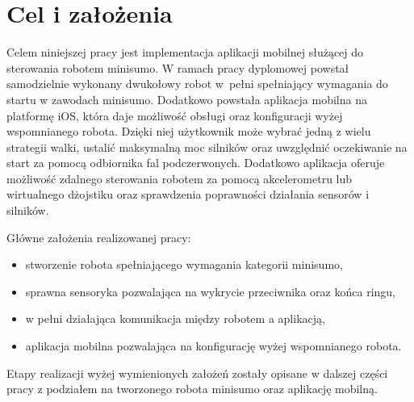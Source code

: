 \section{Cel i założenia}
Celem niniejszej pracy jest implementacja aplikacji mobilnej służącej do sterowania robotem minisumo. W ramach pracy dyplomowej powstał samodzielnie wykonany dwukołowy robot w~pełni spełniający wymagania do startu w zawodach minisumo. Dodatkowo powstała aplikacja mobilna na platformę iOS, która daje możliwość obsługi oraz konfiguracji wyżej wspomnianego robota. Dzięki niej użytkownik może wybrać jedną z wielu strategii walki, ustalić maksymalną moc silników oraz uwzględnić oczekiwanie na start za pomocą odbiornika fal podczerwonych. Dodatkowo aplikacja oferuje możliwość zdalnego sterowania robotem za pomocą akcelerometru lub wirtualnego dżojstiku oraz sprawdzenia poprawności działania sensorów i silników. 

Główne założenia realizowanej pracy:
\begin{itemize}
\item stworzenie robota spełniającego wymagania kategorii minisumo,
\item sprawna sensoryka pozwalająca na wykrycie przeciwnika oraz końca ringu,
\item w pełni działająca komunikacja między robotem a aplikacją,
\item aplikacja mobilna pozwalająca na konfigurację wyżej wspomnianego robota.
\end{itemize}

Etapy realizacji wyżej wymienionych założeń zostały opisane w dalszej części pracy z podziałem na tworzonego robota minisumo oraz aplikację mobilną.
